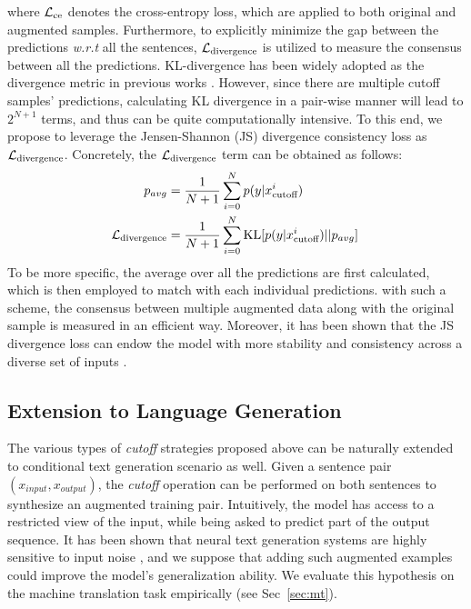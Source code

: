 \documentclass[11pt,a4paper]{article}
\begin{document}
\noindent where ${\mathcal{L}_{\rm ce}}$ denotes the cross-entropy loss, which are applied to both original and augmented samples. Furthermore, to explicitly minimize the gap between the predictions \emph{w.r.t} all the sentences, $\mathcal{L}_{\rm divergence}$ is utilized to measure the consensus between all the predictions. KL-divergence has been widely adopted as the divergence metric in previous works \cite{Miyato2017AdversarialTM, miyato2018virtual, Clark2018SemiSupervisedSM, xie2019unsupervised}. However, since there are multiple cutoff samples' predictions, calculating KL divergence in a pair-wise manner will lead to  $2^{N+1}$ terms, and thus can be quite computationally intensive. To this end, we propose to leverage the Jensen-Shannon (JS) divergence consistency loss as $\mathcal{L}_{\rm divergence}$. 
Concretely, the $\mathcal{L}_{\rm divergence}$ term can be obtained as follows:
\begin{align}
p_{avg} & = \frac{1}{N+1} \sum_{i=0}^{N} p(y|x_\text{cutoff}^{i})   \nonumber \\
\mathcal{L}_{\rm divergence}  & = \frac{1}{N+1} \sum_{i=0}^{N} \text{KL}[p(y|x_\text{cutoff}^{i}) || p_{avg}]  \,    \label{eq:js}
\end{align}
To be more specific, the average over all the predictions are first calculated, which is then employed to match with each individual predictions. with such a scheme, the consensus between multiple augmented data along with the original sample is measured in an efficient way. Moreover, it has been shown that the JS divergence loss can endow the model with more stability and consistency across a diverse set of inputs \cite{Bachman2014LearningWP, Zheng2016ImprovingTR, Kannan2018AdversarialLP, Hendrycks2020AugMixAS}. 
\vspace{-0.5mm}
\subsection{Extension to Language Generation}
\vspace{-0.5mm}
The various types of \emph{cutoff} strategies proposed above can be naturally extended to conditional text generation scenario as well. Given a sentence pair $(x_{input}, x_{output})$, the \emph{cutoff} operation can be performed on both sentences to synthesize an augmented training pair. Intuitively, the model has access to a restricted view of the input, while being asked to predict part of the output sequence. It has been shown that neural text generation systems are highly sensitive to input noise \cite{lee2018hallucinations}, and we suppose that adding such augmented examples could improve the model's generalization ability. We evaluate this hypothesis on the machine translation task empirically (see Sec~\ref{sec:mt}).
\end{document}
